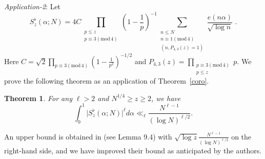 \documentclass[12pt,article]{amsart}
\newtheorem{theorem}{Theorem}[section]
\theoremstyle{remark}
\numberwithin{equation}{section}
\renewcommand{\pmod}[1]{\left(\mathrm{mod}\,#1\right)}
\begin{document}
	
	\vspace{2mm}
	\noindent
	\textit{Application-2}:  Let \[S^\flat_z(\alpha;N)=4C\prod_{\substack{p\leq z\\ p\equiv 3\pmod 4}}\left(1-\frac{1}{p}\right)^{-1}\sum_{\substack{n\leq N\\ n\equiv 1\pmod 4\\ (n, P_{4,3}(z)=1)}}\frac{e(n\alpha)}{\sqrt{\log n}}\; .\]
	Here $C=\sqrt{2}\prod_{p\equiv3\pmod 4}\left(1-\frac{1}{p^2}\right)^{-1/2}$ and $P_{4,3}(z)=\prod_{\substack{p\equiv 3\pmod 4\\ p\leq z}}p.$ 
	We prove the following theorem as an application of Theorem~\ref{coro}.
	\begin{theorem}\label{L1b}
		For any $\ell>2$ and $N^{1/4}\geq z\ge2$, we have
		\begin{equation*}
			\int_0^1\biggl|S^\flat_z(\alpha;N)  \biggr|^\ell d\alpha\ll_{\ell}
			\frac{N^{\ell-1}}{(\log N)^{\ell/2}}.
		\end{equation*}
	\end{theorem}
	\noindent
	An upper bound is obtained in \cite{ORKV} (see Lemma 9.4) with $\sqrt{\log z}\frac{N^{\ell-1}}{(\log N)^{\ell/2}}$ on the right-hand side, and we have improved their bound as anticipated by the authors. 
\end{document}
